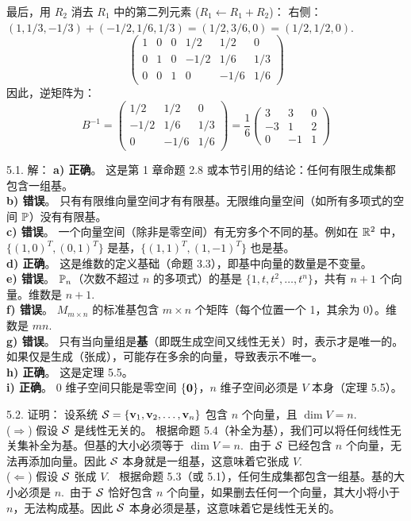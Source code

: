 \begin{exer}
最后，用 $R_2$ 消去 $R_1$ 中的第二列元素 ($R_1 \leftarrow R_1 + R_2$)：
右侧：$(1, 1/3, -1/3) + (-1/2, 1/6, 1/3) = (1/2, 3/6, 0) = (1/2, 1/2, 0)$.~
$$ \left(\begin{array}{ccc|ccc} 1 & 0 & 0 & 1/2 & 1/2 & 0 \\ 0 & 1 & 0 & -1/2 & 1/6 & 1/3 \\ 0 & 0 & 1 & 0 & -1/6 & 1/6 \end{array}\right) $$
因此，逆矩阵为：
$$ B^{-1} = \begin{pmatrix} 1/2 & 1/2 & 0 \\ -1/2 & 1/6 & 1/3 \\ 0 & -1/6 & 1/6 \end{pmatrix} = \frac{1}{6} \begin{pmatrix} 3 & 3 & 0 \\ -3 & 1 & 2 \\ 0 & -1 & 1 \end{pmatrix} $$

\vspace{5ex}


5.1. 解： \textbf{a) 正确}。
这是第 1 章命题 2.8 或本节引用的结论：任何有限生成集都包含一组基。
\\
\textbf{b) 错误}。
只有有限维向量空间才有有限基。无限维向量空间（如所有多项式的空间 $\mathbb{P}$）没有有限基。
\\
\textbf{c) 错误}。
一个向量空间（除非是零空间）有无穷多个不同的基。例如在 $\mathbb{R}^2$ 中，$\{(1,0)^T, (0,1)^T\}$ 是基，$\{(1,1)^T, (1,-1)^T\}$ 也是基。
\\
\textbf{d) 正确}。
这是维数的定义基础（命题 3.3），即基中向量的数量是不变量。
\\
\textbf{e) 错误}。
$\mathbb{P}_n$（次数不超过 $n$ 的多项式）的基是 $\{1, t, t^2, \dots, t^n\}$，共有 $n+1$ 个向量。维数是 $n+1$.~
\\
\textbf{f) 错误}。
$M_{m \times n}$ 的标准基包含 $m \times n$ 个矩阵（每个位置一个 1，其余为 0）。维数是 $mn$.~
\\
\textbf{g) 错误}。
只有当向量组是\textbf{基}（即既生成空间又线性无关）时，表示才是唯一的。如果仅是生成（张成），可能存在多余的向量，导致表示不唯一。
\\
\textbf{h) 正确}。
这是定理 5.5。
\\
\textbf{i) 正确}。
$0$ 维子空间只能是零空间 $\{\mathbf{0}\}$，$n$ 维子空间必须是 $V$ 本身（定理 5.5）。

5.2. 证明：
设系统 $\mathcal{S}  = \{\mathbf{v}_1, \mathbf{v}_2, \dots, \mathbf{v}_n\}$ 包含 $n$ 个向量，且 $\dim V = n$.~
\\
($\Rightarrow$) 假设 $\mathcal{S} $ 是线性无关的。
根据命题 5.4（补全为基），我们可以将任何线性无关集补全为基。但基的大小必须等于 $\dim V = n$.~由于 $\mathcal{S} $ 已经包含 $n$ 个向量，无法再添加向量。因此 $\mathcal{S} $ 本身就是一组基，这意味着它张成 $V$.~
\\
($\Leftarrow$) 假设 $\mathcal{S} $ 张成 $V$.~
根据命题 5.3（或 5.1），任何生成集都包含一组基。基的大小必须是 $n$.~由于 $\mathcal{S} $ 恰好包含 $n$ 个向量，如果删去任何一个向量，其大小将小于 $n$，无法构成基。因此 $\mathcal{S} $ 本身必须是基，这意味着它是线性无关的。


\end{exer}
